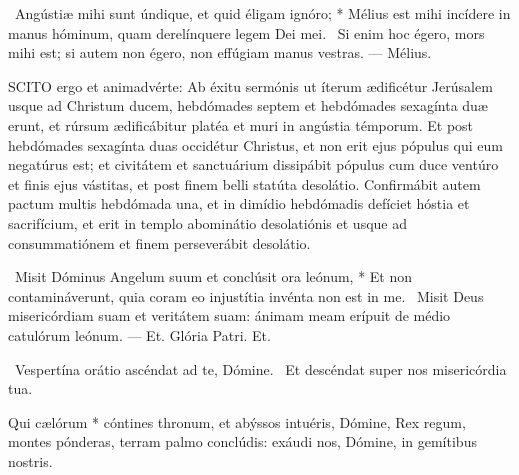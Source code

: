 \R\ Angústiæ mihi sunt úndique, et quid éligam ignóro; * Mélius est mihi incídere in manus hóminum, quam derelínquere legem Dei mei. \V\ Si enim hoc égero, mors mihi est; si autem non égero, non effúgiam manus vestras. — Mélius.



\lettrine[lines=2]{S}{CITO} ergo et animadvérte: Ab éxitu sermónis ut íterum ædificétur Jerúsalem usque ad Christum ducem, hebdómades septem et hebdómades sexagínta duæ erunt, et rúrsum ædificábitur platéa et muri in angústia témporum. Et post hebdómades sexagínta duas occidétur Christus, et non erit ejus pópulus qui eum negatúrus est; et civitátem et sanctuárium dissipábit pópulus cum duce ventúro et finis ejus vástitas, et post finem belli statúta desolátio. Confirmábit autem pactum multis hebdómada una, et in dimídio hebdómadis defíciet hóstia et sacrifícium, et erit in templo abominátio desolatiónis et usque ad consummatiónem et finem perseverábit desolátio.

\R\ Misit Dóminus Angelum suum et conclúsit ora leónum, * Et non contamináverunt, quia coram eo injustítia invénta non est in me. \V\ Misit Deus misericórdiam suam et veritátem suam: ánimam meam erípuit de médio catulórum leónum. — Et. Glória Patri. Et.



\V\ Vespertína orátio ascéndat ad te, Dómine. \R\ Et descéndat super nos misericórdia tua.

 Qui cælórum * cóntines thronum, et abýssos intuéris, Dómine, Rex regum, montes pónderas, terram palmo conclúdis: exáudi nos, Dómine, in gemítibus nostris.



